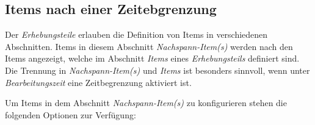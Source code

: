 \documentclass[
  letterpaper,
  DIV=11]{scrreprt}
\begin{document}
\begin{tcolorbox}[enhanced jigsaw, colbacktitle=quarto-callout-tip-color!10!white, coltitle=black, colframe=quarto-callout-tip-color-frame, leftrule=.75mm, breakable, opacitybacktitle=0.6, toprule=.15mm, title=\textcolor{quarto-callout-tip-color}{\faLightbulb}\hspace{0.5em}{Eingebettete Programmhilfe}, colback=white, titlerule=0mm, arc=.35mm, bottomtitle=1mm, toptitle=1mm, rightrule=.15mm, bottomrule=.15mm, left=2mm, opacityback=0]

\hypertarget{items-nach-einer-zeitebgrenzung-1}{%
\subsection{Items nach einer
Zeitebgrenzung}\label{items-nach-einer-zeitebgrenzung-1}}

Der \emph{Erhebungsteile} erlauben die Definition von Items in
verschiedenen Abschnitten. Items in diesem Abschnitt
\emph{Nachspann-Item(s)} werden nach den Items angezeigt, welche im
Abschnitt \emph{Items} eines \emph{Erhebungsteils} definiert sind. Die
Trennung in \emph{Nachspann-Item(s)} und \emph{Items} ist besonders
sinnvoll, wenn unter \emph{Bearbeitungszeit} eine Zeitbegrenzung
aktiviert ist.

Um Items in dem Abschnitt \emph{Nachspann-Item(s)} zu konfigurieren
stehen die folgenden Optionen zur Verfügung:


\end{tcolorbox}
\end{document}
